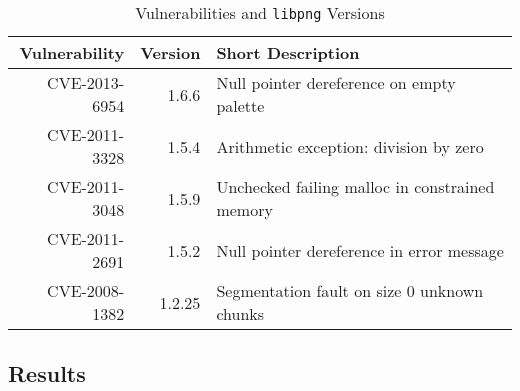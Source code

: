 \begin{table}[H]
\centering
\begin{tabular}{|r|r|l|}
\hline
Vulnerability   & Version 	 	 & Short Description \\ \hline \hline
CVE-2013-6954   & 1.6.6          & Null pointer dereference on empty palette \\ \hline
CVE-2011-3328   & 1.5.4 		 & Arithmetic exception: division by zero   \\ \hline
CVE-2011-3048   & 1.5.9			 & Unchecked failing malloc in constrained memory \\ \hline 
CVE-2011-2691   & 1.5.2			 & Null pointer dereference in error message \\ \hline
CVE-2008-1382   & 1.2.25 		 & Segmentation fault on size 0 unknown chunks \\ \hline 
\end{tabular}
\caption{Vulnerabilities and \texttt{libpng} Versions}
\label{tbl:png:vulns}

\end{table}
\subsection{Results}


